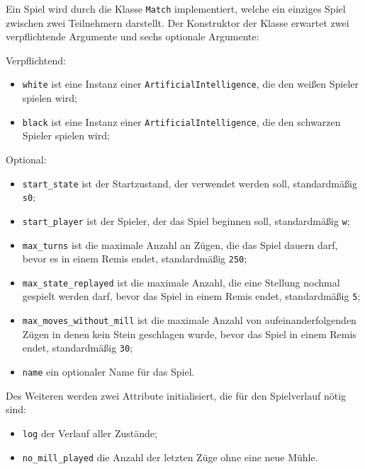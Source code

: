 \documentclass[11pt]{article}
\providecommand{\tightlist}{%
      \setlength{\itemsep}{0pt}\setlength{\parskip}{0pt}}
\begin{document}
Ein Spiel wird durch die Klasse \texttt{Match} implementiert, welche ein
einziges Spiel zwischen zwei Teilnehmern darstellt. Der Konstruktor der
Klasse erwartet zwei verpflichtende Argumente und sechs optionale
Argumente:

Verpflichtend:

\begin{itemize}
\tightlist
\item
  \texttt{white} ist eine Instanz einer \texttt{ArtificialIntelligence},
  die den weißen Spieler spielen wird;
\item
  \texttt{black} ist eine Instanz einer \texttt{ArtificialIntelligence},
  die den schwarzen Spieler spielen wird;
\end{itemize}

Optional:

\begin{itemize}
\tightlist
\item
  \texttt{start\_state} ist der Startzustand, der verwendet werden soll,
  standardmäßig \texttt{s0};
\item
  \texttt{start\_player} ist der Spieler, der das Spiel beginnen soll,
  standardmäßig \texttt{w};
\item
  \texttt{max\_turns} ist die maximale Anzahl an Zügen, die das Spiel
  dauern darf, bevor es in einem Remis endet, standardmäßig
  \texttt{250};
\item
  \texttt{max\_state\_replayed} ist die maximale Anzahl, die eine
  Stellung nochmal gespielt werden darf, bevor das Spiel in einem Remis
  endet, standardmäßig \texttt{5};
\item
  \texttt{max\_moves\_without\_mill} ist die maximale Anzahl von
  aufeinanderfolgenden Zügen in denen kein Stein geschlagen wurde, bevor
  das Spiel in einem Remis endet, standardmäßig \texttt{30};
\item
  \texttt{name} ein optionaler Name für das Spiel.
\end{itemize}

Des Weiteren werden zwei Attribute initialisiert, die für den
Spielverlauf nötig sind:

\begin{itemize}
\tightlist
\item
  \texttt{log} der Verlauf aller Zustände;
\item
  \texttt{no\_mill\_played} die Anzahl der letzten Züge ohne eine neue
  Mühle.
\end{itemize}
\end{document}
